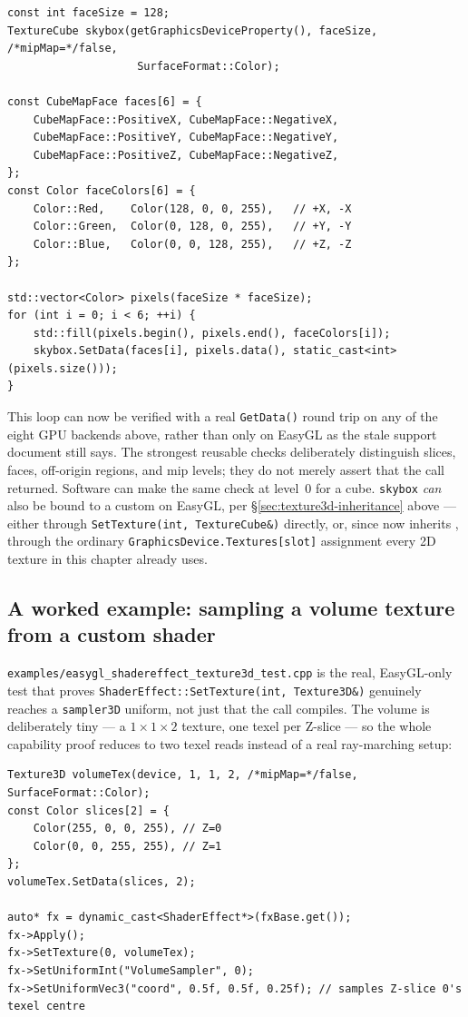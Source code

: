 \begin{lstlisting}
const int faceSize = 128;
TextureCube skybox(getGraphicsDeviceProperty(), faceSize, /*mipMap=*/false,
                    SurfaceFormat::Color);

const CubeMapFace faces[6] = {
    CubeMapFace::PositiveX, CubeMapFace::NegativeX,
    CubeMapFace::PositiveY, CubeMapFace::NegativeY,
    CubeMapFace::PositiveZ, CubeMapFace::NegativeZ,
};
const Color faceColors[6] = {
    Color::Red,    Color(128, 0, 0, 255),   // +X, -X
    Color::Green,  Color(0, 128, 0, 255),   // +Y, -Y
    Color::Blue,   Color(0, 0, 128, 255),   // +Z, -Z
};

std::vector<Color> pixels(faceSize * faceSize);
for (int i = 0; i < 6; ++i) {
    std::fill(pixels.begin(), pixels.end(), faceColors[i]);
    skybox.SetData(faces[i], pixels.data(), static_cast<int>(pixels.size()));
}
\end{lstlisting}

This loop can now be verified with a real \texttt{GetData()} round trip on any of the eight
GPU backends above, rather than only on EasyGL as the stale support document still says.
The strongest reusable checks deliberately distinguish slices, faces, off-origin regions,
and mip levels; they do not merely assert that the call returned. Software can make the same
check at level~0 for a cube. \texttt{skybox} \emph{can} also be bound to a custom
 on EasyGL, per
\S\ref{sec:texture3d-inheritance} above --- either through \texttt{SetTexture(int,
TextureCube\&)} directly, or, since  now inherits ,
through the ordinary \texttt{GraphicsDevice.Textures[slot]} assignment every 2D texture in
this chapter already uses.

\subsection{A worked example: sampling a volume texture from a custom shader}
\label{sec:texture3d-shader-example}

\texttt{examples/easygl\_shadereffect\_texture3d\_test.cpp} is the real, EasyGL-only test
that proves \texttt{ShaderEffect::SetTexture(int, Texture3D\&)} genuinely reaches a
\texttt{sampler3D} uniform, not just that the call compiles. The volume is deliberately
tiny --- a $1\times1\times2$ texture, one texel per Z-slice --- so the whole capability proof
reduces to two texel reads instead of a real ray-marching setup:

\begin{lstlisting}
Texture3D volumeTex(device, 1, 1, 2, /*mipMap=*/false, SurfaceFormat::Color);
const Color slices[2] = {
    Color(255, 0, 0, 255), // Z=0
    Color(0, 0, 255, 255), // Z=1
};
volumeTex.SetData(slices, 2);

auto* fx = dynamic_cast<ShaderEffect*>(fxBase.get());
fx->Apply();
fx->SetTexture(0, volumeTex);
fx->SetUniformInt("VolumeSampler", 0);
fx->SetUniformVec3("coord", 0.5f, 0.5f, 0.25f); // samples Z-slice 0's texel centre
\end{lstlisting}

